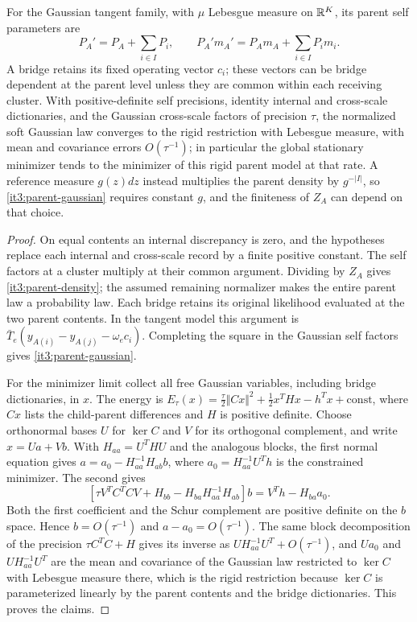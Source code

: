 For the Gaussian tangent family, with $\mu$ Lebesgue measure on $\mathbb R^K$, its parent self parameters are
\begin{equation}
P_A'=P_A+\sum_{i\in I}P_i,\qquad
P_A'm_A'=P_Am_A+\sum_{i\in I}P_im_i.
\label{it3:parent-gaussian}
\end{equation}
A bridge retains its fixed operating vector $c_i$; these vectors can be bridge dependent at the parent level unless they are common within each receiving cluster. With positive-definite self precisions, identity internal and cross-scale dictionaries, and the Gaussian cross-scale factors of precision $\tau$, the normalized soft Gaussian law converges to the rigid restriction with Lebesgue measure, with mean and covariance errors $O(\tau^{-1})$; in particular the global stationary minimizer tends to the minimizer of this rigid parent model at that rate. A reference measure $g(z)dz$ instead multiplies the parent density by $g^{-|I|}$, so \cref{it3:parent-gaussian} requires constant $g$, and the finiteness of $Z_A$ can depend on that choice.
\begin{proof}
On equal contents an internal discrepancy is zero, and the hypotheses replace each internal and cross-scale record by a finite positive constant. The self factors at a cluster multiply at their common argument. Dividing by $Z_A$ gives \cref{it3:parent-density}; the assumed remaining normalizer makes the entire parent law a probability law. Each bridge retains its original likelihood evaluated at the two parent contents. In the tangent model this argument is $\bar T_e(y_{A(i)}-y_{A(j)}-\omega_ec_i)$. Completing the square in the Gaussian self factors gives \cref{it3:parent-gaussian}.

For the minimizer limit collect all free Gaussian variables, including bridge dictionaries, in $x$. The energy is
$E_\tau(x)=\frac{\tau}{2}\Vert Cx\Vert^2+\frac12x^THx-h^Tx+\mathrm{const}$,
where $Cx$ lists the child-parent differences and $H$ is positive definite. Choose orthonormal bases $U$ for $\ker C$ and $V$ for its orthogonal complement, and write $x=Ua+Vb$. With $H_{aa}=U^THU$ and the analogous blocks, the first normal equation gives
$a=a_0-H_{aa}^{-1}H_{ab}b$, where $a_0=H_{aa}^{-1}U^Th$ is the constrained minimizer. The second gives
\begin{equation}
\left[\tau V^TC^TCV+H_{bb}-H_{ba}H_{aa}^{-1}H_{ab}\right]b
=V^Th-H_{ba}a_0.
\end{equation}
Both the first coefficient and the Schur complement are positive definite on the $b$ space. Hence $b=O(\tau^{-1})$ and $a-a_0=O(\tau^{-1})$. The same block decomposition of the precision $\tau C^TC+H$ gives its inverse as $UH_{aa}^{-1}U^T+O(\tau^{-1})$, and $Ua_0$ and $UH_{aa}^{-1}U^T$ are the mean and covariance of the Gaussian law restricted to $\ker C$ with Lebesgue measure there, which is the rigid restriction because $\ker C$ is parameterized linearly by the parent contents and the bridge dictionaries. This proves the claims.
\end{proof}

